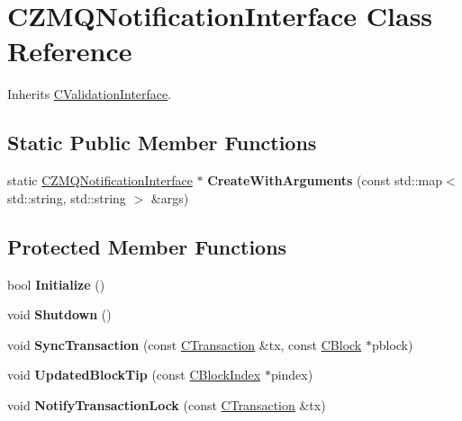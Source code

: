 \hypertarget{class_c_z_m_q_notification_interface}{}\section{C\+Z\+M\+Q\+Notification\+Interface Class Reference}
\label{class_c_z_m_q_notification_interface}


Inherits \mbox{\hyperlink{class_c_validation_interface}{C\+Validation\+Interface}}.

\subsection*{Static Public Member Functions}
\begin{DoxyCompactItemize}
\item 
\mbox{\label{class_c_z_m_q_notification_interface_a791ea8fd1b414482c9a811ac5ae79a26}} 
static \mbox{\hyperlink{class_c_z_m_q_notification_interface}{C\+Z\+M\+Q\+Notification\+Interface}} $\ast$ {\bfseries Create\+With\+Arguments} (const std\+::map$<$ std\+::string, std\+::string $>$ \&args)
\end{DoxyCompactItemize}
\subsection*{Protected Member Functions}
\begin{DoxyCompactItemize}
\item 
\mbox{\label{class_c_z_m_q_notification_interface_a33097d2313d722ff02dd0f2c77f66d58}} 
bool {\bfseries Initialize} ()
\item 
\mbox{\label{class_c_z_m_q_notification_interface_a2eceddf8e9e3ac248ba922ef24eb8d3a}} 
void {\bfseries Shutdown} ()
\item 
\mbox{\label{class_c_z_m_q_notification_interface_a70a0919ccfbc5fb24cd16909c6d03c05}} 
void {\bfseries Sync\+Transaction} (const \mbox{\hyperlink{class_c_transaction}{C\+Transaction}} \&tx, const \mbox{\hyperlink{class_c_block}{C\+Block}} $\ast$pblock)
\item 
\mbox{\label{class_c_z_m_q_notification_interface_acd3d5dbbb9741847d161e55f875b83a5}} 
void {\bfseries Updated\+Block\+Tip} (const \mbox{\hyperlink{class_c_block_index}{C\+Block\+Index}} $\ast$pindex)
\item 
\mbox{\label{class_c_z_m_q_notification_interface_a82c8518d4631965696b31439fca225b6}} 
void {\bfseries Notify\+Transaction\+Lock} (const \mbox{\hyperlink{class_c_transaction}{C\+Transaction}} \&tx)
\end{DoxyCompactItemize}



